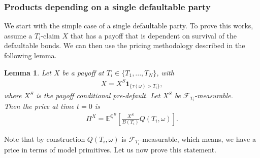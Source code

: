 \documentclass[12pt]{article}
\newtheorem{lemma}[theorem]{Lemma}
\begin{document}
	\subsubsection{Products depending on a single defaultable party}
	We start with the simple case of a single defaultable party. To prove this works, assume a $T_i$-claim $X$ that has a payoff that is dependent on survival of the defaultable bonds. We can then use the pricing methodology described in the following lemma.
	\begin{lemma}\label{lm:pricingdefaultableclaims}
		Let $X$ be a payoff at $T_i \in \{T_1, ..., T_N\}$, with
		\begin{align*}
			X = X^S \mathbf{1}_{\{\tau(\omega) > T_i\}},
		\end{align*}
		where $X^S$ is the payoff conditional pre-default. Let $X^S$ be $\mathcal{F}_{T_i}$-measurable.\\
		Then the price at time $t=0$ is
		\begin{align*}
			\Pi^X = \mathbb{E}^{\mathbb{Q}^B}\left[ \frac{X^S}{B(T_i)} Q\left(T_i,\omega\right) \right].
		\end{align*}
	\end{lemma}
	Note that by construction $Q(T_i, \omega)$ is $\mathcal{F}_{T_i}$-measurable, which means, we have a price in terms of model primitives. Let us now prove this statement.
\end{document}
